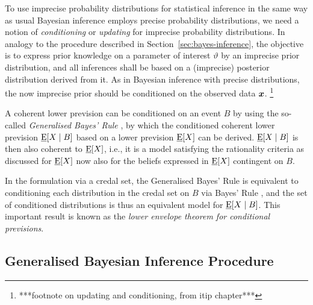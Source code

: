 To use imprecise probability distributions for statistical inference
in the same way as usual Bayesian inference employs precise probability distributions,
we need a notion of \emph{conditioning} or \emph{updating} for imprecise probability distributions.
In analogy to the procedure described in Section~\ref{sec:bayes-inference},
the objective is to express prior knowledge on a parameter of interest $\vartheta$
by an imprecise prior distribution,
and all inferences shall be based on a (imprecise) posterior distribution derived from it.
As in Bayesian inference with precise distributions,
the now imprecise prior should be conditioned on the observed data ${\bm x}$.%
\footnote{***footnote on updating and conditioning, from itip chapter***}

A coherent lower prevision can be conditioned on an event $B$
by using the so-called \emph{Generalised Bayes' Rule} \parencite[\S 6.4]{1991:walley},
by which the conditioned coherent lower prevision $\underline{\operatorname{E}}[X\mid B]$
based on a lower prevision $\underline{\operatorname{E}}[X]$ can be derived.
$\underline{\operatorname{E}}[X\mid B]$ is then also coherent to $\underline{\operatorname{E}}[X]$, i.e.,
it is a model satisfying the rationality criteria as discussed for $\underline{\operatorname{E}}[X]$
now also for the beliefs expressed in $\underline{\operatorname{E}}[X]$ contingent on $B$.

In the formulation via a credal set, the Generalised Bayes' Rule
is equivalent to conditioning each distribution in the credal set on $B$ via Bayes' Rule
\parencite[\S 6.4.2]{1991:walley},
and the set of conditioned distributions is thus an equivalent model for $\underline{\operatorname{E}}[X\mid B]$.
This important result is known as the \emph{lower envelope theorem for conditional previsions}.


\subsection{Generalised Bayesian Inference Procedure}
\label{sec:imprecisebayes}


